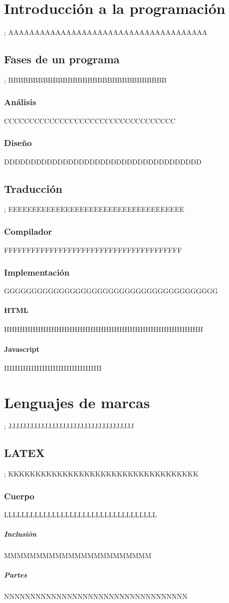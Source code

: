 \documentclass[10pt,a4paper]{book}
\begin{document}
\chapter{Introducción a la programación};
AAAAAAAAAAAAAAAAAAAAAAAAAAAAAAAAAAAAAA
	\section{Fases de un programa};
	BBBBBBBBBBBBBBBBBBBBBBBBBBBBBBBB
		\subsection{Análisis}
		CCCCCCCCCCCCCCCCCCCCCCCCCCCCCCCCCC
		\subsection{Diseño}
		DDDDDDDDDDDDDDDDDDDDDDDDDDDDDDDDDDDDD
	\section{Traducción};
	EEEEEEEEEEEEEEEEEEEEEEEEEEEEEEEEEEEEE
		\subsection{Compilador}
		FFFFFFFFFFFFFFFFFFFFFFFFFFFFFFFFFFFFFFF
		\subsection{Implementación}
		GGGGGGGGGGGGGGGGGGGGGGGGGGGGGGGGGGGGGGG
			\subsubsection{HTML}
			HHHHHHHHHHHHHHHHHHHHHHHHHHHHHHHHHHHHHH
			\subsubsection{Javascript}
			IIIIIIIIIIIIIIIIIIIIIIIIIIIIIIIIIIII
			
			
\chapter{Lenguajes de marcas};
JJJJJJJJJJJJJJJJJJJJJJJJJJJJJJJJJJJ
	\section{LATEX};
	KKKKKKKKKKKKKKKKKKKKKKKKKKKKKKKKKKK
		\subsection{Cuerpo}
		LLLLLLLLLLLLLLLLLLLLLLLLLLLLLLLLLLL
	\paragraph{Inclusión}
	MMMMMMMMMMMMMMMMMMMMMMM
	\paragraph{Partes}
	NNNNNNNNNNNNNNNNNNNNNNNNNNNNNNNNNNN
\end{document}
